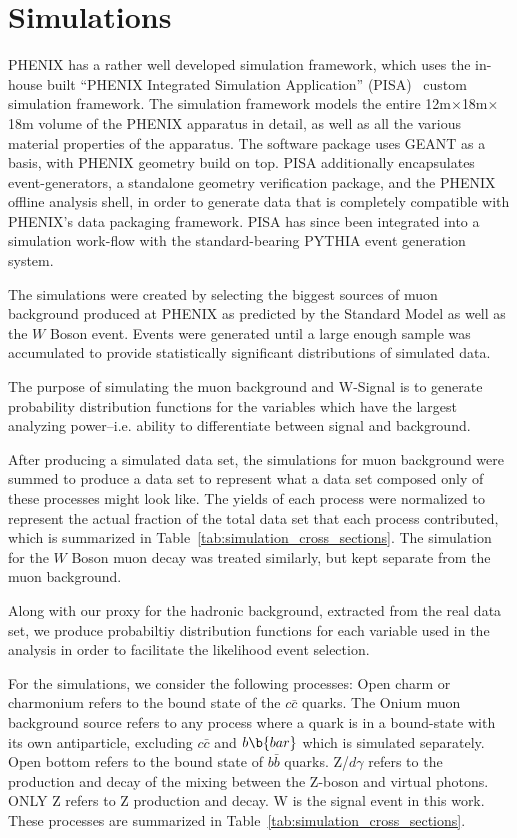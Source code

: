 \clearpage
\section{Simulations}

PHENIX has a rather well developed simulation framework, which uses the in-house
built ``PHENIX Integrated Simulation Application'' (PISA)~\cite{Maguire1997}
custom simulation framework. The simulation framework models the entire
12m$\times$18m$\times$18m volume of the PHENIX apparatus in detail, as well as
all the various material properties of the apparatus. The software package uses
GEANT as a basis, with PHENIX geometry build on top. PISA additionally
encapsulates event-generators, a standalone geometry verification package, and
the PHENIX offline analysis shell, in order to generate data that is completely
compatible with PHENIX's data packaging framework. PISA has since been
integrated into a simulation work-flow with the standard-bearing PYTHIA event
generation system.

The simulations were created by selecting the biggest sources of muon background
produced at PHENIX as predicted by the Standard Model as well as the $W$ Boson
event. Events were generated until a large enough sample was accumulated to
provide statistically significant distributions of simulated data.

The purpose of simulating the muon background and W-Signal is to generate
probability distribution functions for the variables which have the largest
analyzing power--i.e. ability to differentiate between signal and background.

After producing a simulated data set, the simulations for muon background were
summed to produce a data set to represent what a data set composed only of these
processes might look like. The yields of each process were normalized to
represent the actual fraction of the total data set that each process
contributed, which is summarized in Table~\ref{tab:simulation_cross_sections}.
The simulation for the $W$ Boson muon decay was treated similarly, but kept
separate from the muon background.

Along with our proxy for the hadronic background, extracted from the real data
set, we produce probabiltiy distribution functions for each variable used in the
analysis in order to facilitate the likelihood event selection.

For the simulations, we consider the following processes: Open charm or
charmonium refers to the bound state of the $c\bar{c}$ quarks. The Onium muon
background source refers to any process where a quark is in a bound-state with
its own antiparticle, excluding $c\bar{c}$ and $b\b{bar}$ which is simulated
separately. Open bottom refers to the bound state of $b\bar{b}$ quarks.
Z/$d\gamma$ refers to the production and decay of the mixing between the Z-boson
and virtual photons. ONLY Z refers to Z production and decay.  W is the signal
event in this work.  These processes are summarized in
Table~\ref{tab:simulation_cross_sections}.  

